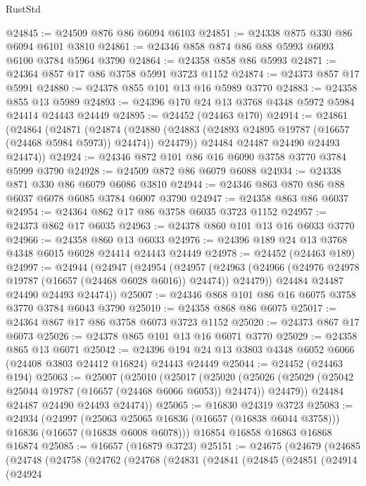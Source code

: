 \begin{lexlean}{RustStd}
\begin{coremodule}
@24845 := @24509 @876 @86 @6094 @6103
@24851 := @24338 @875 @330 @86 @6094 @6101 @3810
@24861 := @24346 @858 @874 @86 @88 @5993 @6093 @6100 @3784 @5964 @3790
@24864 := @24358 @858 @86 @5993
@24871 := @24364 @857 @17 @86 @3758 @5991 @3723 @1152
@24874 := @24373 @857 @17 @5991
@24880 := @24378 @855 @101 @13 @16 @5989 @3770
@24883 := @24358 @855 @13 @5989
@24893 := @24396 @170 @24 @13 @3768 @4348 @5972 @5984 @24414 @24443 @24449
@24895 := @24452 (@24463 @170)
@24914 := @24861
    (@24864
      (@24871
        (@24874
          (@24880 (@24883 (@24893 @24895 @19787 (@16657 (@24468 @5984 @5973)) @24474)) @24479))
        @24484
        @24487
        @24490
        @24493
        @24474))
@24924 := @24346 @872 @101 @86 @16 @6090 @3758 @3770 @3784 @5999 @3790
@24928 := @24509 @872 @86 @6079 @6088
@24934 := @24338 @871 @330 @86 @6079 @6086 @3810
@24944 := @24346 @863 @870 @86 @88 @6037 @6078 @6085 @3784 @6007 @3790
@24947 := @24358 @863 @86 @6037
@24954 := @24364 @862 @17 @86 @3758 @6035 @3723 @1152
@24957 := @24373 @862 @17 @6035
@24963 := @24378 @860 @101 @13 @16 @6033 @3770
@24966 := @24358 @860 @13 @6033
@24976 := @24396 @189 @24 @13 @3768 @4348 @6015 @6028 @24414 @24443 @24449
@24978 := @24452 (@24463 @189)
@24997 := @24944
    (@24947
      (@24954
        (@24957
          (@24963 (@24966 (@24976 @24978 @19787 (@16657 (@24468 @6028 @6016)) @24474)) @24479))
        @24484
        @24487
        @24490
        @24493
        @24474))
@25007 := @24346 @868 @101 @86 @16 @6075 @3758 @3770 @3784 @6043 @3790
@25010 := @24358 @868 @86 @6075
@25017 := @24364 @867 @17 @86 @3758 @6073 @3723 @1152
@25020 := @24373 @867 @17 @6073
@25026 := @24378 @865 @101 @13 @16 @6071 @3770
@25029 := @24358 @865 @13 @6071
@25042 := @24396 @194 @24 @13 @3803 @4348 @6052 @6066 (@24408 @3803 @24412 @16824) @24443 @24449
@25044 := @24452 (@24463 @194)
@25063 := @25007
    (@25010
      (@25017
        (@25020
          (@25026 (@25029 (@25042 @25044 @19787 (@16657 (@24468 @6066 @6053)) @24474)) @24479))
        @24484
        @24487
        @24490
        @24493
        @24474))
@25065 := @16830 @24319 @3723
@25083 := @24934
    (@24997
      (@25063 @25065 @16836 (@16657 (@16838 @6044 @3758)))
      @16836
      (@16657 (@16838 @6008 @6078)))
    @16854
    @16858
    @16863
    @16868
    @16874
@25085 := @16657 (@16879 @3723)
@25151 := @24675
    (@24679
      (@24685
        (@24748
          (@24758
            (@24762
              (@24768
                (@24831
                  (@24841
                    (@24845
                      (@24851
                        (@24914
                          (@24924

\end{coremodule}
\end{lexlean}
